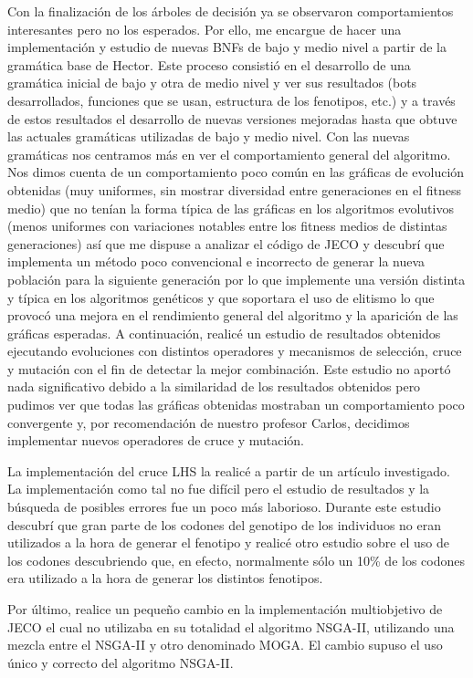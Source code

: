 Con la finalización de los árboles de decisión ya se observaron comportamientos interesantes pero no los esperados. Por ello, me encargue de hacer una implementación y estudio de nuevas BNFs de bajo y medio nivel a partir de la gramática base de Hector. Este proceso consistió en el desarrollo de una gramática inicial de bajo y otra de medio nivel y ver sus resultados (bots desarrollados, funciones que se usan, estructura de los fenotipos, etc.) y a través de estos resultados el desarrollo de nuevas versiones mejoradas hasta que obtuve las actuales gramáticas utilizadas de bajo y medio nivel.
Con las nuevas gramáticas nos centramos más en ver el comportamiento general del algoritmo. Nos dimos cuenta de un comportamiento poco común en las gráficas de evolución obtenidas (muy uniformes, sin mostrar diversidad entre generaciones en el fitness medio) que no tenían la forma típica de las gráficas en los algoritmos evolutivos (menos uniformes con variaciones notables entre los fitness medios de distintas generaciones) así que me dispuse a analizar el código de JECO y descubrí que implementa un método poco convencional e incorrecto de generar la nueva población para la siguiente generación por lo que implemente una versión distinta y típica en los algoritmos genéticos y que soportara el uso de elitismo lo que provocó una mejora en el rendimiento general del algoritmo y la aparición de las gráficas esperadas. A continuación, realicé un estudio de resultados obtenidos ejecutando evoluciones con distintos operadores y mecanismos de selección, cruce y mutación con el fin de detectar la mejor combinación. Este estudio no aportó nada significativo debido a la similaridad de los resultados obtenidos pero pudimos ver que todas las gráficas obtenidas mostraban un comportamiento poco convergente y, por recomendación de nuestro profesor Carlos, decidimos implementar nuevos operadores de cruce y mutación.

La implementación del cruce LHS la realicé a partir de un artículo investigado. La implementación como tal no fue difícil pero el estudio de resultados y la búsqueda de posibles errores fue un poco más laborioso. Durante este estudio descubrí que gran parte de los codones del genotipo de los individuos no eran utilizados a la hora de generar el fenotipo y realicé otro estudio sobre el uso de los codones descubriendo que, en efecto, normalmente sólo un 10\% de los codones era utilizado a la hora de generar los distintos fenotipos.

Por último, realice un pequeño cambio en la implementación multiobjetivo de JECO el cual no utilizaba en su totalidad el algoritmo NSGA-II, utilizando una mezcla entre el NSGA-II y otro denominado MOGA. El cambio supuso el uso único y correcto del algoritmo NSGA-II.
 
